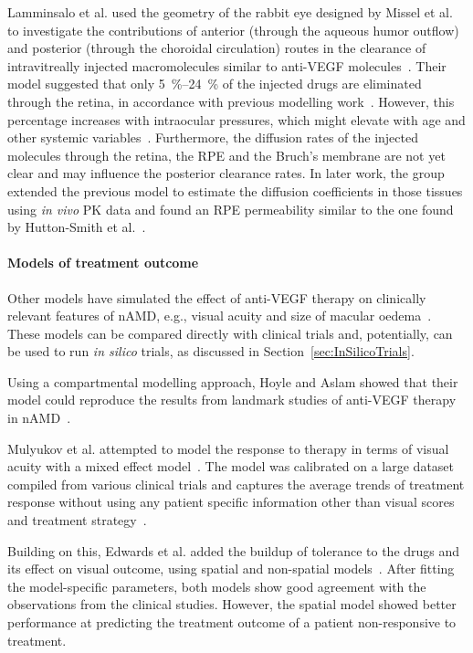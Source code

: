 \documentclass{article}
\begin{document}
Lamminsalo et al. used the geometry of the rabbit eye designed by Missel et al. to investigate the contributions of anterior (through the aqueous humor outflow) and posterior (through the choroidal circulation) routes in the clearance of intravitreally injected macromolecules similar to anti-VEGF molecules~\cite{Lamminsalo_2018}.
Their model suggested that only \SIrange[range-units = single]{5}{24}{\percent} of the injected drugs are eliminated through the retina, in accordance with previous modelling work~\cite{HuttonSmith_2017}.
However, this percentage increases with intraocular pressures, which might elevate with age and other systemic variables~\cite{Armaly_1967,Hashemi_2005}.
Furthermore, the diffusion rates of the injected molecules through the retina, the RPE and the Bruch's membrane are not yet clear and may influence the posterior clearance rates.
In later work, the group extended the previous model to estimate the diffusion coefficients in those tissues using \textit{in vivo} PK data and found an RPE permeability similar to the one found by Hutton-Smith et al.~\cite{Lamminsalo_2020,HuttonSmith_2017}.

\paragraph*{Models of treatment outcome}

Other models have simulated the effect of anti-VEGF therapy on clinically relevant features of nAMD, e.g., visual acuity and size of macular oedema~\cite{Edwards_2020, Hoyle_2017, Mulyukov_2018}.
These models can be compared directly with clinical trials and, potentially, can be used to run \textit{in silico} trials, as discussed in Section~\ref{sec:InSilicoTrials}.

Using a compartmental modelling approach, Hoyle and Aslam showed that their model could reproduce the results from landmark studies of anti-VEGF therapy in nAMD~\cite{Hoyle_2017}.

Mulyukov et al. attempted to model the response to therapy in terms of visual acuity with a mixed effect model~\cite{Mulyukov_2018}.
The model was calibrated on a large dataset compiled from various clinical trials and captures the average trends of treatment response without using any patient specific information other than visual scores and treatment strategy~\cite{Mulyukov_2018}.

Building on this, Edwards et al. added the buildup of tolerance to the drugs and its effect on visual outcome, using spatial and non-spatial models~\cite{Edwards_2020}.
After fitting the model-specific parameters, both models show good agreement with the observations from the clinical studies.
However, the spatial model showed better performance at predicting the treatment outcome of a patient non-responsive to treatment.
\end{document}
